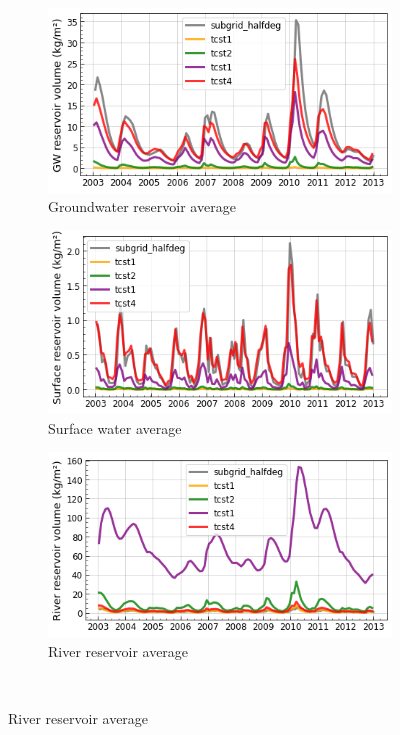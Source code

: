 \begin{figure}[htbp]
    \centering
    \begin{subfigure}[b]{0.32\textwidth}
        \caption{Groundwater reservoir average}
        \includegraphics[width=\textwidth]{images/chap3/time_series/slowr_time_series_tcsts.png}
    \end{subfigure}
    \begin{subfigure}[b]{0.32\textwidth}
        \caption{Surface water average}
        \includegraphics[width=\textwidth]{images/chap3/time_series/fastr_time_series_tcsts.png}
    \end{subfigure}
    \begin{subfigure}[b]{0.32\textwidth}
        \caption{River reservoir average}
        \includegraphics[width=\textwidth]{images/chap3/time_series/streamr_time_series_tcsts.png}
    \end{subfigure} \\


\end{figure}
